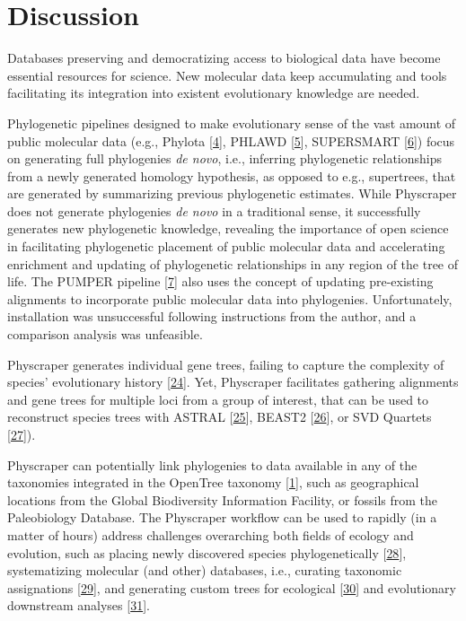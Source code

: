 \documentclass[]{article}
\begin{document}
\hypertarget{discussion}{%
\section{Discussion}\label{discussion}}

Databases preserving and democratizing access to biological data
have become essential resources for science.
New molecular data keep accumulating and tools facilitating its integration into existent evolutionary knowledge are needed.

Phylogenetic pipelines designed to make evolutionary sense of the vast amount of public molecular data (e.g., Phylota {[}\protect\hyperlink{ref-sanderson2008phylota}{4}{]}, PHLAWD {[}\protect\hyperlink{ref-smith2009mega}{5}{]}, SUPERSMART {[}\protect\hyperlink{ref-antonelli2017toward}{6}{]}) focus on generating full phylogenies \emph{de novo}, i.e., inferring phylogenetic relationships from a newly generated homology hypothesis, as opposed to e.g., supertrees, that are generated by summarizing previous phylogenetic estimates.
While Physcraper does not generate phylogenies \emph{de novo} in a traditional sense,
it successfully generates new phylogenetic knowledge, revealing the importance of
open science in facilitating phylogenetic placement of public molecular data and accelerating enrichment and updating of phylogenetic relationships in any region of the tree of life.
The PUMPER pipeline {[}\protect\hyperlink{ref-izquierdo2014pumper}{7}{]} also uses the concept of updating
pre-existing alignments to incorporate public molecular data into phylogenies. Unfortunately, installation was unsuccessful following instructions from the author, and a comparison analysis was unfeasible.

Physcraper generates individual gene trees, failing to capture the complexity of species' evolutionary history {[}\protect\hyperlink{ref-song2012resolving}{24}{]}. Yet, Physcraper facilitates gathering alignments and gene trees for multiple loci from a group of interest, that can be used to reconstruct species trees with ASTRAL {[}\protect\hyperlink{ref-mirarab2014astral}{25}{]}, BEAST2 {[}\protect\hyperlink{ref-bouckaert2019beast}{26}{]}, or SVD Quartets {[}\protect\hyperlink{ref-chifman2014quartet}{27}{]}).

Physcraper can potentially link phylogenies to data available in any of the taxonomies integrated in the OpenTree taxonomy {[}\protect\hyperlink{ref-rees2017automated}{1}{]}, such as geographical locations from the Global Biodiversity Information Facility, or fossils from the Paleobiology Database.
The Physcraper workflow can be used to rapidly (in a matter of hours)
address challenges overarching both fields of ecology and evolution, such as
placing newly discovered species phylogenetically {[}\protect\hyperlink{ref-webb2010biodiversity}{28}{]},
systematizing molecular (and other) databases, i.e., curating taxonomic assignations {[}\protect\hyperlink{ref-san2010molecular}{29}{]},
and generating custom trees for ecological {[}\protect\hyperlink{ref-helmus2012phylogenetic}{30}{]} and evolutionary downstream analyses {[}\protect\hyperlink{ref-stoltzfus2013phylotastic}{31}{]}.
\end{document}
